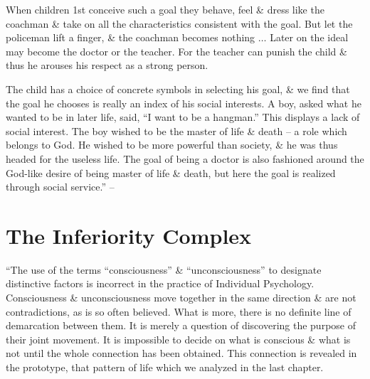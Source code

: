 \documentclass{article}
\numberwithin{equation}{section}
\begin{document}
When children 1st conceive such a goal they behave, feel \& dress like the coachman \& take on all the characteristics consistent with the goal. But let the policeman lift a finger, \& the coachman becomes nothing $\ldots$ Later on the ideal may become the doctor or the teacher. For the teacher can punish the child \& thus he arouses his respect as a strong person.

The child has a choice of concrete symbols in selecting his goal, \& we find that the goal he chooses is really an index of his social interests. A boy, asked what he wanted to be in later life, said, ``I want to be a hangman.'' This displays a lack of social interest. The boy wished to be the master of life \& death -- a role which belongs to God. He wished to be more powerful than society, \& he was thus headed for the useless life. The goal of being a doctor is also fashioned around the God-like desire of being master of life \& death, but here the goal is realized through social service.'' -- \cite[pp. 31--55]{Adler2013}


\section{The Inferiority Complex}
``The use of the terms ``consciousness'' \& ``unconsciousness'' to designate distinctive factors is incorrect in the practice of Individual Psychology. Consciousness \& unconsciousness move together in the same direction \& are not contradictions, as is so often believed. What is more, there is no definite line of demarcation between them. It is merely a question of discovering the purpose of their joint movement. It is impossible to decide on what is conscious \& what is not until the whole connection has been obtained. This connection is revealed in the prototype, that pattern of life which we analyzed in the last chapter.
\end{document}
